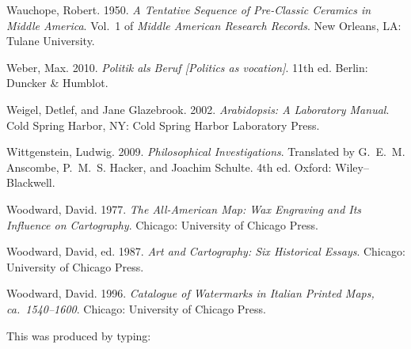 \documentclass[]{interact}
\theoremstyle{plain}%
\theoremstyle{definition}
\theoremstyle{remark}
\begin{document}
\begin{thebibliography}{}
Wauchope, Robert. 1950. \emph{A Tentative Sequence of Pre-Classic Ceramics in
	Middle {A}merica}. Vol.~1 of \emph{Middle {A}merican Research Records}. New
Orleans, LA: Tulane University.

Weber, Max. 2010. \emph{Politik als Beruf \emph{[Politics as vocation]}}. 11th
ed. Berlin: Duncker \& Humblot.

Weigel, Detlef, and Jane Glazebrook. 2002. \emph{Arabidopsis: A Laboratory
	Manual}. Cold Spring Harbor, NY: Cold Spring Harbor Laboratory Press.

Wittgenstein, Ludwig. 2009. \emph{Philosophical Investigations}. Translated by
G.~E.~M. Anscombe, P.~M.~S. Hacker, and Joachim Schulte. 4th ed. Oxford:
Wiley--Blackwell.

Woodward, David. 1977. \emph{The All-{A}merican Map: Wax Engraving and Its
	Influence on Cartography}. Chicago: University of Chicago Press.

Woodward, David, ed. 1987. \emph{Art and Cartography: Six Historical Essays}.
Chicago: University of Chicago Press.

Woodward, David. 1996. \emph{Catalogue of Watermarks in {I}talian Printed Maps,
	ca.~1540--1600}. Chicago: University of Chicago Press.

\end{thebibliography}
\bigskip
\noindent This was produced by typing:
\end{document}
